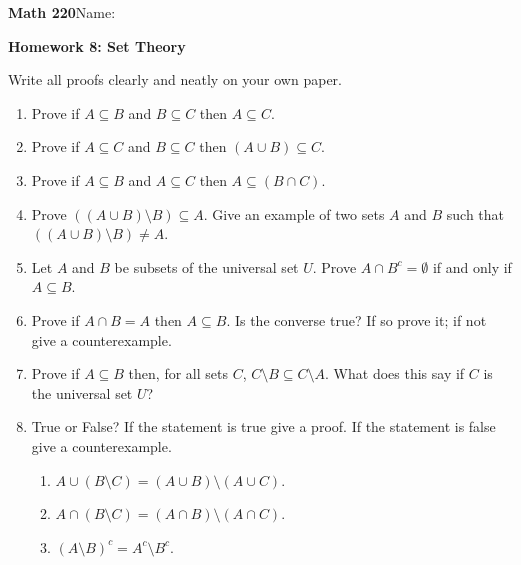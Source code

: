 \documentclass{article}
\begin{document}
{\bf Math 220}\hfill{Name:}

{\bf Homework 8: Set Theory}
\vspace{.3in}

Write all proofs clearly and neatly on your own paper.

\begin{enumerate}

\item Prove if $A\subseteq B$ and $B \subseteq C$ then $A\subseteq C$.

\item Prove if $A\subseteq C$ and $B \subseteq C$ then $(A\cup B)\subseteq C$.

\item Prove if $A\subseteq B$ and $A \subseteq C$ then $A\subseteq (B\cap C)$.

\item Prove $((A\cup B)\setminus B)\subseteq A$. Give an example of two sets $A$ and $B$ such that $((A\cup B)\setminus B)\neq A$.

\item Let $A$ and $B$ be subsets of the universal set $U$. Prove $A\cap B^c=\emptyset$ if and only if $A\subseteq B$.

\item Prove if $A\cap B=A$ then $A\subseteq B$. Is the converse true? If so prove it; if not give a counterexample.

\item Prove if $A\subseteq B$ then, for all sets $C$, $C\setminus B\subseteq C\setminus A$. What does this say if $C$ is the universal set $U$?

\item True or False? If the statement is true give a proof. If the statement is false give a counterexample.
\begin{enumerate}
\item $A\cup(B\setminus C)=(A\cup B)\setminus (A\cup C)$.
\item $A\cap(B\setminus C)=(A\cap B)\setminus (A\cap C)$.
\item $(A\setminus B)^c=A^c\setminus B^c$.
\end{enumerate}

\end{enumerate}
\end{document}
